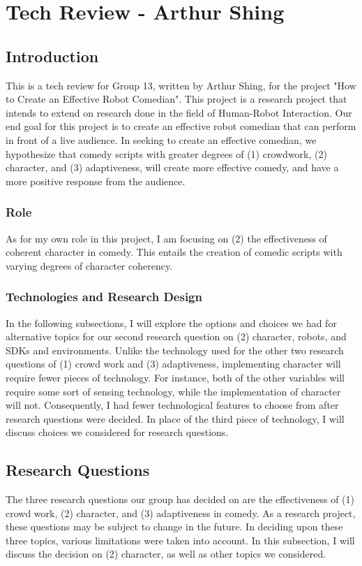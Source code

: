 \section{Tech Review - Arthur Shing}
\subsection{Introduction}


This is a tech review for Group 13, written by Arthur Shing, for the project "How to Create an Effective Robot Comedian".
This project is a research project that intends to extend on research done in the field of Human-Robot Interaction.
Our end goal for this project is to create an effective robot comedian that can perform in front of a live audience.
In seeking to create an effective comedian, we hypothesize that comedy scripts with greater degrees of (1) crowdwork, (2) character, and (3) adaptiveness, will create more effective comedy, and have a more positive response from the audience.

\subsubsection{Role}
As for my own role in this project, I am focusing on (2) the effectiveness of coherent character in comedy.
This entails the creation of comedic scripts with varying degrees of character coherency.

\subsubsection{Technologies and Research Design}
In the following subsections, I will explore the options and choices we had for alternative topics for our second research question on (2) character, robots, and SDKs and environments. Unlike the technology used for the other two research questions of (1) crowd work and (3) adaptiveness, implementing character will require fewer pieces of technology. For instance, both of the other variables will require some sort of sensing technology, while the implementation of character will not. Consequently, I had fewer technological features to choose from after research questions were decided. In place of the third piece of technology, I will discuss choices we considered for research questions.


\subsection{Research Questions}
The three research questions our group has decided on are the effectiveness of (1) crowd work, (2) character, and (3) adaptiveness in comedy. As a research project, these questions may be subject to change in the future. In deciding upon these three topics, various limitations were taken into account. In this subsection, I will discuss the decision on (2) character, as well as other topics we considered.


